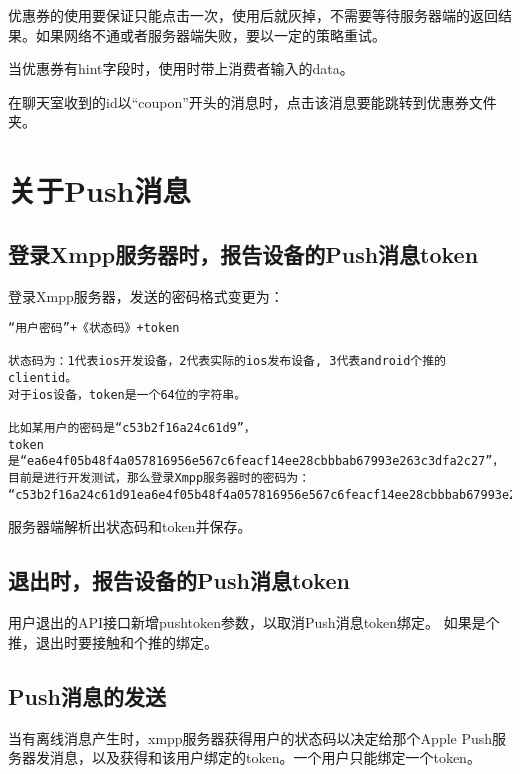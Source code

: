 优惠券的使用要保证只能点击一次，使用后就灰掉，不需要等待服务器端的返回结果。如果网络不通或者服务器端失败，要以一定的策略重试。

当优惠券有hint字段时，使用时带上消费者输入的data。


在聊天室收到的id以“coupon”开头的消息时，点击该消息要能跳转到优惠券文件夹。




\section{关于Push消息}

\subsection{登录Xmpp服务器时，报告设备的Push消息token}
登录Xmpp服务器，发送的密码格式变更为：

\begin{verbatim}
“用户密码”+《状态码》+token

状态码为：1代表ios开发设备，2代表实际的ios发布设备, 3代表android个推的clientid。
对于ios设备，token是一个64位的字符串。

比如某用户的密码是“c53b2f16a24c61d9”，
token是“ea6e4f05b48f4a057816956e567c6feacf14ee28cbbbab67993e263c3dfa2c27”，
目前是进行开发测试，那么登录Xmpp服务器时的密码为：
“c53b2f16a24c61d91ea6e4f05b48f4a057816956e567c6feacf14ee28cbbbab67993e263c3dfa2c27”。
\end{verbatim}

服务器端解析出状态码和token并保存。


\subsection{退出时，报告设备的Push消息token}

用户退出的API接口新增pushtoken参数，以取消Push消息token绑定。
如果是个推，退出时要接触和个推的绑定。

\subsection{Push消息的发送}
当有离线消息产生时，xmpp服务器获得用户的状态码以决定给那个Apple Push服务器发消息，以及获得和该用户绑定的token。一个用户只能绑定一个token。
